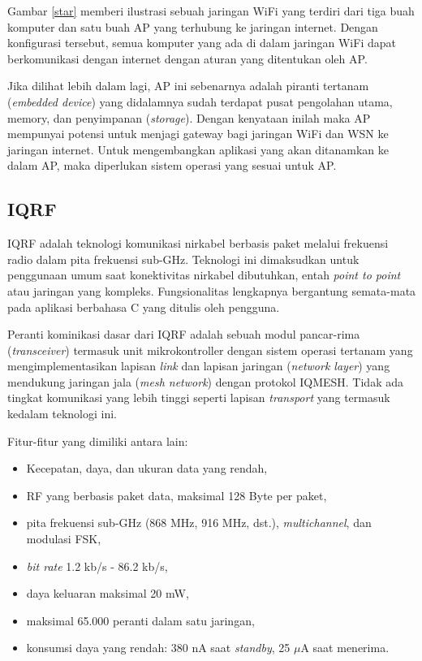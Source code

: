     Gambar \ref{star} memberi ilustrasi sebuah jaringan WiFi yang terdiri dari tiga buah komputer dan satu buah AP yang terhubung ke jaringan internet. Dengan konfigurasi tersebut, semua komputer yang ada di dalam jaringan WiFi dapat berkomunikasi dengan internet dengan aturan yang ditentukan oleh AP.

    Jika dilihat lebih dalam lagi, AP ini sebenarnya adalah piranti tertanam (\emph{embedded device}) yang didalamnya sudah terdapat pusat pengolahan utama, memory, dan penyimpanan (\emph{storage}). Dengan kenyataan inilah maka AP mempunyai potensi untuk menjagi gateway bagi jaringan WiFi dan WSN ke jaringan internet. Untuk mengembangkan aplikasi yang akan ditanamkan ke dalam AP, maka diperlukan sistem operasi yang sesuai untuk AP.

  \subsection{IQRF}
    IQRF adalah teknologi komunikasi nirkabel berbasis paket melalui frekuensi radio dalam pita frekuensi sub-GHz. Teknologi ini dimaksudkan untuk penggunaan umum saat konektivitas nirkabel dibutuhkan, entah \emph{point to point} atau jaringan yang kompleks. Fungsionalitas lengkapnya bergantung semata-mata pada aplikasi berbahasa C yang ditulis oleh pengguna.

    Peranti kominikasi dasar dari IQRF adalah sebuah modul pancar-rima (\emph{transceiver}) termasuk unit mikrokontroller dengan sistem operasi tertanam yang mengimplementasikan lapisan \emph{link} dan lapisan jaringan (\emph{network layer}) yang mendukung jaringan jala (\emph{mesh network}) dengan protokol IQMESH. Tidak ada tingkat komunikasi yang lebih tinggi seperti lapisan \emph{transport} yang termasuk kedalam teknologi ini.

    Fitur-fitur yang dimiliki antara lain:
      \begin{itemize}
        \item Kecepatan, daya, dan ukuran data yang rendah,
        \item RF yang berbasis paket data, maksimal 128 Byte per paket,
        \item pita frekuensi sub-GHz (868 MHz, 916 MHz, dst.), \emph{multichannel}, dan modulasi FSK,
        \item \emph{bit rate} 1.2 kb/s - 86.2 kb/s,
        \item daya keluaran maksimal 20 mW,
        \item maksimal 65.000 peranti dalam satu jaringan,
        \item konsumsi daya yang rendah: 380 nA saat \emph{standby}, 25 $\mu$A saat menerima.
      \end{itemize}


